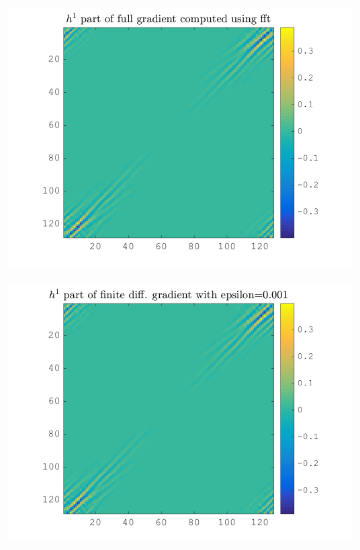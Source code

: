\begin{figure}[!ht]\centering
\begin{subfigure}[b]{0.49\textwidth}\centering
\includegraphics[width=\textwidth]{figures/verif_gradient/gradient.png}
\end{subfigure}
\begin{subfigure}[b]{0.49\textwidth}\centering
\includegraphics[width=\textwidth]{figures/verif_gradient/finite-diff.png}
\end{subfigure}
\begin{subfigure}[b]{0.49\textwidth}\centering

\end{subfigure}
\end{figure}
